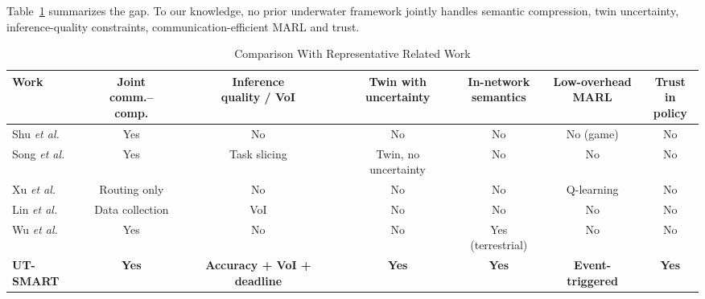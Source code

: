 \documentclass[lettersize,journal]{IEEEtran}
\begin{document}
Table~\ref{tab:related} summarizes the gap. To our knowledge, no prior underwater framework jointly handles semantic compression, twin uncertainty, inference-quality constraints, communication-efficient MARL and trust.

\begin{table}[!t]
\centering
\caption{Comparison With Representative Related Work}
\label{tab:related}
\begin{tabular}{@{}lcccccc@{}}
\toprule
Work & \shortstack{Joint\\comm.--comp.} & \shortstack{Inference\\quality / VoI} & \shortstack{Twin with\\uncertainty} & \shortstack{In-network\\semantics} & \shortstack{Low-overhead\\MARL} & \shortstack{Trust in\\policy}\\
\midrule
Shu \emph{et al.}~\cite{shu2026offload} & Yes & No & No & No & No (game) & No\\
Song \emph{et al.}~\cite{song2025dtna} & Yes & Task slicing & Twin, no uncertainty & No & No & No\\
Xu \emph{et al.}~\cite{xu2025stgr} & Routing only & No & No & No & Q-learning & No\\
Lin \emph{et al.}~\cite{lin2025madac} & Data collection & VoI & No & No & No & No\\
Wu \emph{et al.}~\cite{wu2024inc} & Yes & No & No & Yes (terrestrial) & No & No\\
\textbf{UT-SMART} & \textbf{Yes} & \textbf{Accuracy + VoI + deadline} & \textbf{Yes} & \textbf{Yes} & \textbf{Event-triggered} & \textbf{Yes}\\
\bottomrule
\end{tabular}
\end{table}
\end{document}
